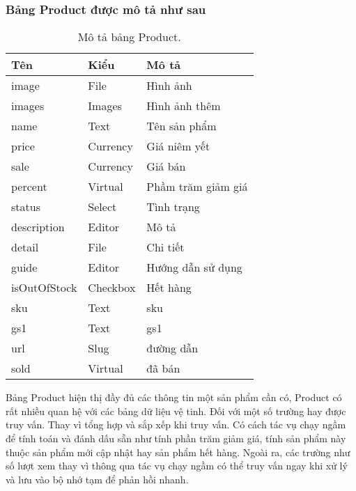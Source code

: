 \subsubsection{Bảng Product được mô tả như sau}
\begin{table}[!htbp]\fontsize{13px}{13px}\selectfont\justifying
\begin{center}
\caption{Mô tả bảng Product.}
\begin{tabularx}{0.6\textwidth}{ |l|l|X| } 
\hline
Tên & Kiểu & Mô tả \\
\hline
image & File & Hình ảnh \\
images & Images & Hình ảnh thêm \\
name & Text & Tên sản phẩm \\
price & Currency & Giá niêm yết \\
sale & Currency & Giá bán \\
percent & Virtual & Phầm trăm giảm giá \\
status & Select & Tình trạng \\
description & Editor & Mô tả \\
detail & File & Chi tiết \\
guide & Editor & Hướng dẫn sử dụng \\
isOutOfStock & Checkbox & Hết hàng \\
sku & Text & sku \\
gs1 & Text & gs1 \\
url & Slug & đường dẫn \\
sold & Virtual & đã bán \\
\hline
\end{tabularx}
\label{table:Product}
\end{center}
Bảng Product hiện thị đầy đủ các thông tin một sản phẩm cần có, Product có rất nhiều quan hệ với các bảng dữ liệu vệ tinh. Đối với một số trường hay được truy vấn. Thay vì tổng hợp và sắp xếp khi truy vấn. Có cách tác vụ chạy ngầm để tính toán và đánh dấu sẵn như tính phần trăm giảm giá, tính sản phẩm này thuộc sản phẩm mới cập nhật hay sản phẩm hết hàng. Ngoài ra, các trường như số lượt xem thay vì thông qua tác vụ chạy ngầm có thể truy vấn ngay khi xử lý và lưu vào bộ nhớ tạm để phản hồi nhanh.
\end{table}

